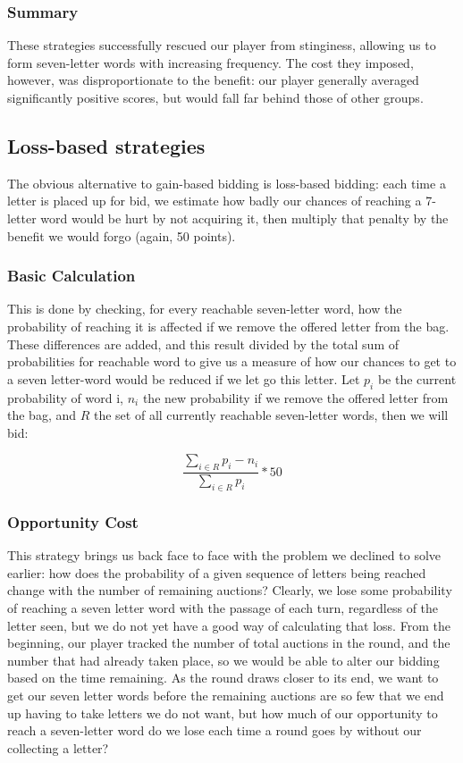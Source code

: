 \documentclass[11pt]{article}
\begin{document}
\subsubsection{Summary}

These strategies successfully rescued our player from stinginess, allowing us to form seven-letter words with increasing frequency.  The cost they imposed, however, was disproportionate to the benefit: our player generally averaged significantly positive scores, but would fall far behind those of other groups.

\subsection{Loss-based strategies}

The obvious alternative to gain-based bidding is loss-based bidding: each time a letter is placed up for bid, we estimate how badly our chances of reaching a 7-letter word would be hurt by not acquiring it, then multiply that penalty by the benefit we would forgo (again, 50 points).  

\subsubsection{Basic Calculation}

This is done by checking, for every reachable seven-letter word, how the probability of reaching it is affected if we remove the offered letter from the bag. These differences are added, and this result divided by the total sum of probabilities for reachable word to give us a measure of how our chances to get to a seven letter-word would be reduced if we let go this letter. Let $p_i$ be the current probability of word i, $n_i$ the new probability if we remove the offered letter from the bag, and $R$ the set of all currently reachable seven-letter words, then we will bid:

$$\frac{\sum_{i \in R}p_i - n_i}{\sum_{i \in R}p_i} * 50$$

\subsubsection{Opportunity Cost}

This strategy brings us back face to face with the problem we declined to solve earlier: how does the probability of a given sequence of letters being reached change with the number of remaining auctions?  Clearly, we lose some probability of reaching a seven letter word with the passage of each turn, regardless of the letter seen, but we do not yet have a good way of calculating that loss.  From the beginning, our player tracked the number of total auctions in the round, and the number that had already taken place, so we would be able to alter our bidding based on the time remaining.
As the round draws closer to its end, we want to get our seven letter words before the remaining auctions are so few that we end up having to take letters we do not want, but how much of our opportunity to reach a seven-letter word do we lose each time a round goes by without our collecting a letter? 
\end{document}
